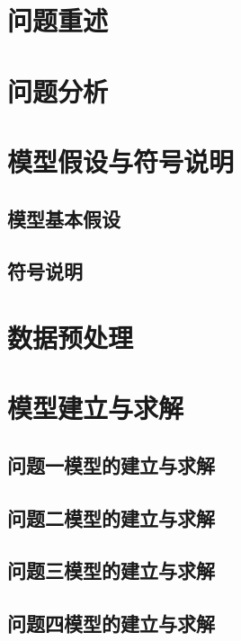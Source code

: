 \documentclass[UTF8,a4paper,zihao=-4]{ctexart}
\begin{document}
\section{问题重述}

\clearpage

\section{问题分析}


\section{模型假设与符号说明}
\subsection{模型基本假设}


\clearpage
\subsection{符号说明}


\section{数据预处理}


\section{模型建立与求解}
\subsection{问题一模型的建立与求解}


\subsection{问题二模型的建立与求解}


\subsection{问题三模型的建立与求解}


\subsection{问题四模型的建立与求解}

\end{document}
